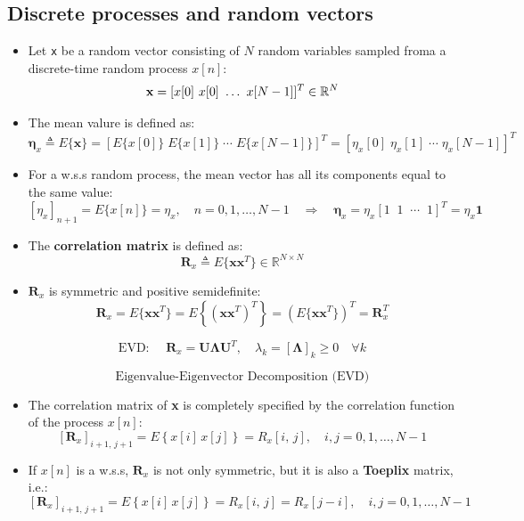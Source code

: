 \subsection{Discrete processes and random vectors}
\begin{itemize}
    \item Let \texttt{x} be a random vector consisting of \(N\) random variables sampled froma a discrete-time random process \(x[n]\):
    \[
    \mathbf{x}=[x[0]\hspace{0.35em}x[0]\hspace{0.35em}\dots\hspace{0.35em}x[N-1]]^T \in\mathbb{R}^N   \]
    \item The mean valure is defined as:
    \[
\mathbf{\eta}_x \triangleq E\{\mathbf{x}\} = \left[ E\{x[0]\}\; E\{x[1]\}\; \cdots\; E\{x[N-1]\} \right]^T = \left[ \eta_x[0]\; \eta_x[1]\; \cdots\; \eta_x[N-1] \right]^T
\]
\item For a w.s.s random process, the mean vector has all its components equal to the same value:
\[
\left[ \eta_x \right]_{n+1} = E\{x[n]\} = \eta_x, \quad n = 0, 1, \ldots, N-1 \quad \Rightarrow \quad \mathbf{\eta}_x = \eta_x \left[ 1 \;\; 1 \;\; \cdots \;\; 1 \right]^T = \eta_x \mathbf{1}
\]
\item The \textbf{correlation matrix} is defined as:
\[
\mathbf{R}_x \triangleq E\{\mathbf{xx}^T\}\in\mathbb{R}^{N\times N}
\]
\item \(\mathbf{R}_x\) is symmetric and positive semidefinite:
\[
\mathbf{R}_x = E\{ \mathbf{x} \mathbf{x}^T \} = E\left\{ \left( \mathbf{x} \mathbf{x}^T \right)^T \right\} = \left( E\{ \mathbf{x} \mathbf{x}^T \} \right)^T = \mathbf{R}_x^T
\]

\[
\text{EVD: } \quad \mathbf{R}_x = \mathbf{U} \mathbf{\Lambda} \mathbf{U}^T, \quad \lambda_k = [\mathbf{\Lambda}]_k \geq 0 \quad \forall k
\]

\[
\text{Eigenvalue-Eigenvector Decomposition (EVD)}
\]
\item The correlation matrix of \textbf{x} is completely specified by the correlation function of the process \(x[n]\):
\[
\left[ \mathbf{R}_x \right]_{i+1,\,j+1} = E\left\{ x[i]\,x[j] \right\} = R_x[i,\,j], \quad i, j = 0, 1, \ldots, N-1
\]
\item If \(x[n]\) is a w.s.s, \(\mathbf{R}_x\) is not only symmetric, but it is also a \textbf{Toeplix} matrix, i.e.:
\[
\left[ \mathbf{R}_x \right]_{i+1,\,j+1} = E\left\{ x[i]\,x[j] \right\} = R_x[i,\,j] = R_x[j-i],\quad i, j = 0, 1, \ldots, N-1
\]


\end{itemize}
